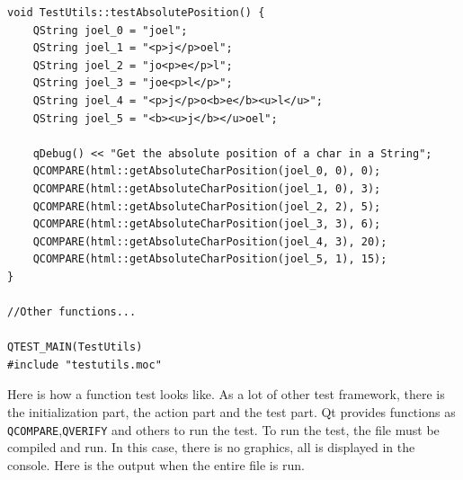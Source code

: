 \begin{lstlisting}
void TestUtils::testAbsolutePosition() {
    QString joel_0 = "joel";
    QString joel_1 = "<p>j</p>oel";
    QString joel_2 = "jo<p>e</p>l";
    QString joel_3 = "joe<p>l</p>";
    QString joel_4 = "<p>j</p>o<b>e</b><u>l</u>";
    QString joel_5 = "<b><u>j</b></u>oel";

    qDebug() << "Get the absolute position of a char in a String";
    QCOMPARE(html::getAbsoluteCharPosition(joel_0, 0), 0);
    QCOMPARE(html::getAbsoluteCharPosition(joel_1, 0), 3);
    QCOMPARE(html::getAbsoluteCharPosition(joel_2, 2), 5);
    QCOMPARE(html::getAbsoluteCharPosition(joel_3, 3), 6);
    QCOMPARE(html::getAbsoluteCharPosition(joel_4, 3), 20);
    QCOMPARE(html::getAbsoluteCharPosition(joel_5, 1), 15);
}

//Other functions...

QTEST_MAIN(TestUtils)
#include "testutils.moc"
\end{lstlisting}
Here is how a function test looks like. As a lot of other test framework, there is the initialization part, the action part and the test part. Qt provides functions as \texttt{QCOMPARE},\texttt{QVERIFY} and others to run the test. To run the test, the file must be compiled and run. In this case, there is no graphics, all is displayed in the console. Here is the output when the entire file is run.

